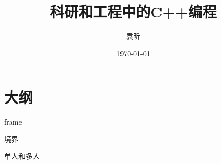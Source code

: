 \documentclass[11pt]{beamer}
\title{科研和工程中的C++编程}
\author{袁昕}
\date{\today}
\begin{document}
\frame{\titlepage}


\section*{大纲}

\frame{\tableofcontents}

%

frame{
\centerline{\textbf{\Huge{}}}
}

境界


单人和多人


\end{document}
